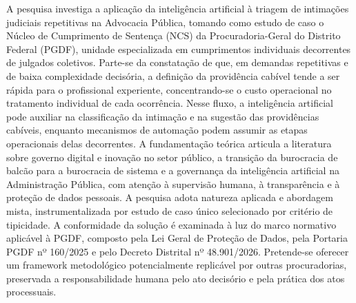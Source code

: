 
\begin{resumo}
A pesquisa investiga a aplicação da inteligência artificial à triagem de
intimações judiciais repetitivas na Advocacia Pública, tomando como estudo de
caso o Núcleo de Cumprimento de Sentença (NCS) da Procuradoria-Geral do
Distrito Federal (PGDF), unidade especializada em cumprimentos individuais
decorrentes de julgados coletivos. Parte-se da constatação de que, em demandas
repetitivas e de baixa complexidade decisória, a definição da providência
cabível tende a ser rápida para o profissional experiente, concentrando-se o
custo operacional no tratamento individual de cada ocorrência. Nesse fluxo, a
inteligência artificial pode auxiliar na classificação da intimação e na
sugestão das providências cabíveis, enquanto mecanismos de automação podem
assumir as etapas operacionais delas decorrentes. A fundamentação teórica
articula a literatura sobre governo digital e inovação no setor público, a
transição da burocracia de balcão para a burocracia de sistema e a governança
da inteligência artificial na Administração Pública, com atenção à supervisão
humana, à transparência e à proteção de dados pessoais. A pesquisa adota
natureza aplicada e abordagem mista, instrumentalizada por estudo de caso
único selecionado por critério de tipicidade. A conformidade da solução é
examinada à luz do marco normativo aplicável à PGDF, composto pela Lei Geral
de Proteção de Dados, pela Portaria PGDF nº 160/2025 e pelo Decreto Distrital
nº 48.901/2026. Pretende-se oferecer um framework metodológico potencialmente
replicável por outras procuradorias, preservada a responsabilidade humana pelo
ato decisório e pela prática dos atos processuais.
\end{resumo}
